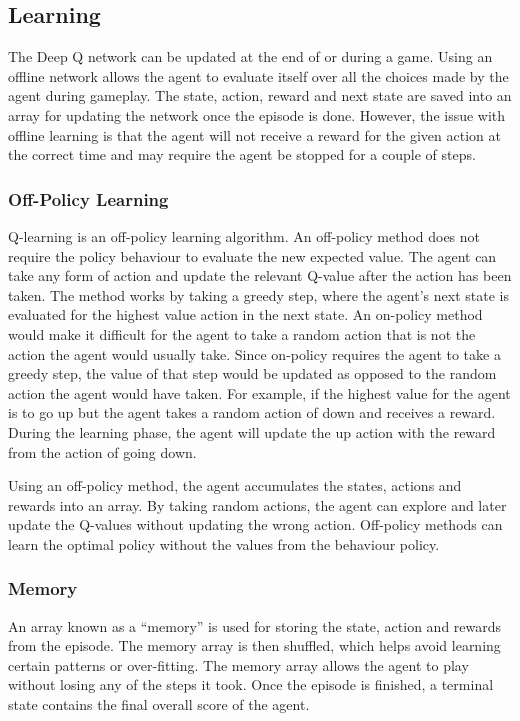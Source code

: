 \subsection{Learning}

The Deep Q network can be updated at the end of or during a game. Using an
offline network allows the agent to evaluate itself over all the choices made by
the agent during gameplay. The state, action, reward and next state are saved
into an array for updating the network once the episode is done. However, the
issue with offline learning is that the agent will not receive a reward for the
given action at the correct time and may require the agent be stopped for a
couple of steps.

\subsubsection{Off-Policy Learning}

Q-learning is an off-policy learning algorithm. An off-policy method does not
require the policy behaviour to evaluate the new expected value. The agent can
take any form of action and update the relevant Q-value after the action
has been taken. The method works by taking a greedy step, where the agent's next
state is evaluated for the highest value action in the next state. An on-policy
method would make it difficult for the agent to take a random action that is not
the action the agent would usually take. Since on-policy requires the agent to
take a greedy step, the value of that step would be updated as opposed to the
random action the agent would have taken. For example, if the highest value for
the agent is to go up but the agent takes a random action of down and receives a
reward. During the learning phase, the agent will update the up action with the
reward from the action of going down.

Using an off-policy method, the agent accumulates the states, actions and
rewards into an array. By taking random actions, the agent can explore and later
update the Q-values without updating the wrong action. Off-policy methods can
learn the optimal policy without the values from the behaviour policy.

\subsubsection{Memory}

An array known as a ``memory'' is used for storing the state, action and rewards
from the episode. The memory array is then shuffled, which helps avoid learning
certain patterns or over-fitting. The memory array allows the agent to play
without losing any of the steps it took. Once the episode is finished, a
terminal state contains the final overall score of the agent.

